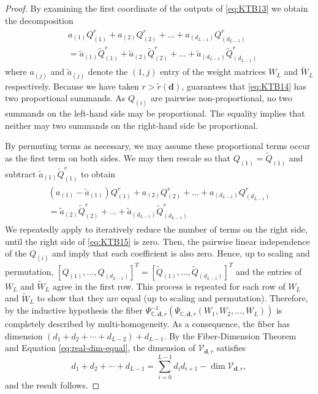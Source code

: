 \documentclass[12pt]{article}
\theoremstyle{definition}
\newcommand{\bfd}{\mathbf{d}}
\newcommand{\prw}[1]{p_{\mathbf{w}_{#1}}^r}
\newcommand{\pw}[1]{p_{\mathbf{w}_{#1}}}
\newcommand{\tildeprw}[1]{\tilde{p}_{\mathbf{w}_{#1}}^r}
\newcommand{\tildepw}[1]{\tilde{p}_{\mathbf{w}_{#1}}}
\renewcommand{\prw}[1]{Q_{({#1})}^r}
\renewcommand{\pw}[1]{Q_{({#1})}}
\renewcommand{\tildeprw}[1]{\tilde{Q}_{({#1})}^r}
\renewcommand{\tildepw}[1]{\tilde{Q}_{({#1})}}
\newcommand{\wLone}[1]{w_{L_{1#1}}}
\newcommand{\tildewLone}[1]{w_{L_{1#1}}}
\renewcommand{\wLone}[1]{a_{({#1})}}
\renewcommand{\tildewLone}[1]{\tilde{a}_{({#1})}}
\newcommand{\complexPsiMap}{\Psi_{{\mathbb{C},\mathbf{d},r}}}
\renewcommand{\dim}[1]{\operatorname{dim}{#1}}
\begin{document}
\begin{proof}
By examining the first coordinate of the outputs of \eqref{eq:KTB13} we obtain the decomposition
\begin{align}\label{eq:KTB14}
\begin{split}
    & {\wLone{1}\prw{1}
    + \wLone{2}\prw{2}
    + \dots
    + \wLone{d_{L-1}}\prw{d_{L-1}}}
    \\&= {
     \tildewLone{1}
     \tildeprw{1}
    +\tildewLone{2}
    \tildeprw{2}
    +\dots
    +\tildewLone{d_{L-1}} \tildeprw{d_{L-1}}}
\end{split}
\end{align}
where 
{$\wLone{j}$ and $\tildewLone{j}$ denote the $(1,j)$} entry of the weight matrices $W_L$ and $\tilde{W}_L$ respectively.
Because we have taken $r>\tilde{r}(\bfd)$,   guarantees that \eqref{eq:KTB14} has two proportional summands. 
As $\pw{i}$
are pairwise non-proportional,
no two summands on the left-hand side may be proportional. 
The equality implies that neither may two summands on the right-hand side be proportional. 

By permuting terms as necessary, we may assume these proportional terms 
occur as the first term on both sides. 
We may then rescale so that 
$\pw{1}=\tildepw{1}$
and subtract $\tildewLone{1}\tildeprw{1}$
to obtain 
\begin{align}\label{eq:KTB15}
\begin{split}
    \left(\wLone{1}-\tildewLone{1}   \right)
    \prw{1}
    + \wLone{2}\prw{2}
    + \dots
    + \wLone{d_{L-1}}\prw{d_{L-1}}
    \\=  
    \tildewLone{2}  
    \tildeprw{2}
    +\dots
    +\tildewLone{d_{L-1}} \tildeprw{d_{L-1}}
\end{split}
\end{align}
We repeatedly apply  to iteratively reduce the number of terms on the right side, until the right side of \eqref{eq:KTB15} is zero. Then, the pairwise linear independence of the $\pw{i}$ 
and  imply that each coefficient is also zero. Hence, up to scaling and permutation, 
    $\left[\pw{1},\dots,\pw{d_{L-1}}\right]^T=\left[\tildepw{1},\dots,
    \tildepw{d_{L-1}}
    \right]^T$ 
and the entries of $W_L$ and $\tilde{W}_{L}$ agree in the first row. This process is repeated for each row of $W_L$ and $\tilde{W}_L$ to show that they are equal (up to scaling and permutation).
Therefore, by the inductive hypothesis the fiber $\complexPsiMap^{-1}(\complexPsiMap(W_1,W_2,\dots,W_L))$ 
 is completely described by multi-homogeneity.
 As a consequence, the fiber 
has dimension $(d_1+d_2+\cdots+d_{L-2})+d_{L-1}.$
By the 
Fiber-Dimension Theorem~\cite[Theorem~1.25, Part (ii)]{Shafarevich-Hirsch} and Equation \eqref{eq:real-dim-equal}, 
the dimension of $\mathcal{V}_{\mathbf{d},r}$ satisfies 
\[
d_{1}+d_2+\cdots +d_{L-1}=
\sum_{i=0}^{L-1}d_id_{i+1} - \dim{\mathcal{V}_{\bfd,r}},
\] and the result follows.
\end{proof}
\end{document}
